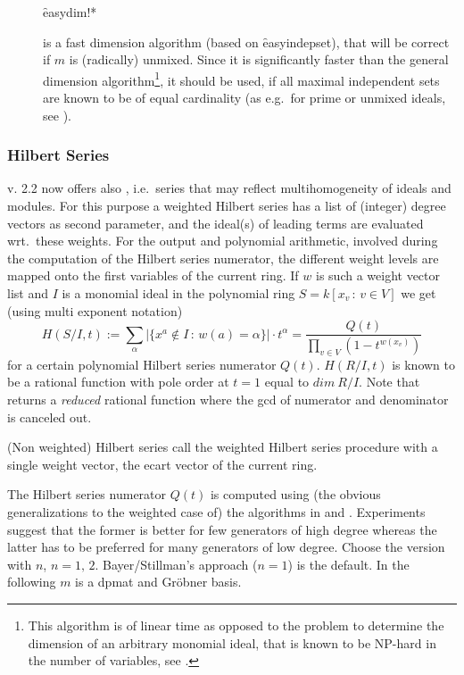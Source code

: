 \begin{description}
\item[]
  \begin{syntax}
    \f{easydim!*} 
  \end{syntax}
  \hypertarget{procedure:EASYDIM!*}{}
is a fast dimension algorithm (based on \f{easyindepset}), that
will be correct if $m$ is (radically) unmixed. Since it is
significantly faster than the general dimension
algorithm\footnote{This algorithm is of linear time as opposed to the
problem to determine the dimension of an arbitrary monomial ideal,
that is known to be NP-hard in the number of variables, see
\cite{BayerStillman:92}.}, it should
be used, if all maximal independent sets are known to be of equal
cardinality (as e.g.\ for prime or unmixed ideals, see \cite{Graebe:93a}).

\end{description}

\subsubsection{Hilbert Series}

 v. 2.2 now offers also , i.e.\
series that may reflect multihomogeneity of ideals and modules. For
this purpose
a weighted Hilbert series has a list of (integer) degree vectors
as second parameter, and the ideal(s) of leading terms are evaluated
wrt.\ these weights. For the output and polynomial arithmetic,
involved during the computation of the Hilbert series numerator, the
different weight levels are mapped onto the first variables of the
current ring. If $w$ is such a weight vector list and $I$ is a
monomial ideal in the polynomial ring $S=k[x_v\,:\,v\in V]$ we get
(using multi exponent notation)
\[H(S/I,t) := \sum_{\alpha}{|\{x^a\not\in I\,:\,w(a)=\alpha\}|\cdot
t^\alpha} = \frac{Q(t)}{\prod_{v\in V}{\left(1-t^{w(x_v)}\right)} }\]
for a certain polynomial Hilbert series numerator $Q(t)$. $H(R/I,t)$
is known to be a rational function with pole order at $t=1$ equal to
$dim\ R/I$. Note that \ind{WeightedHilbertSeries} returns a
\emph{reduced} rational function where the gcd of numerator and denominator
is canceled out.

(Non weighted) Hilbert series call the weighted Hilbert series
procedure with a single weight vector, the ecart vector of the current
ring.

The Hilbert series numerator $Q(t)$ is computed using (the obvious
generalizations to the weighted case of) the algorithms in \cite{BayerStillman:92}
and \cite{Bigatti:93}. Experiments suggest that the former is better for few
generators of high degree whereas the latter has to be preferred for
many generators of low degree. Choose the version with
 $n$, $n=1,\,2$. Bayer/Stillman's approach ($n=1$)
is the default. In the following $m$ is a dpmat and Gr\"obner basis.

